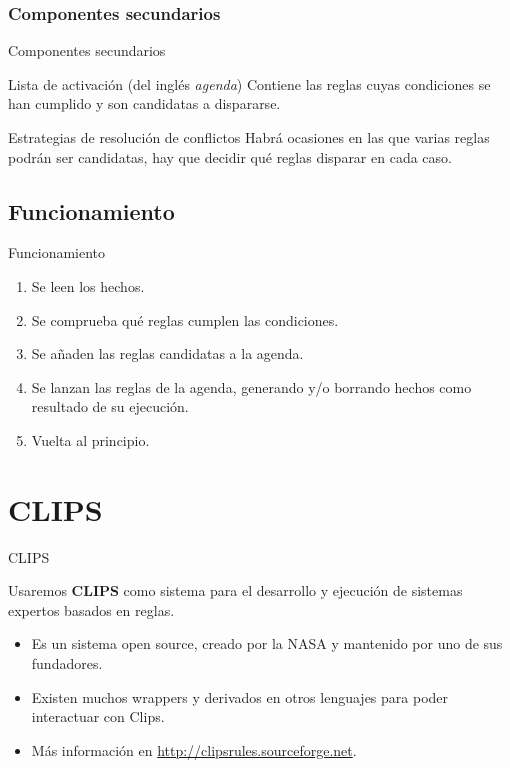 \documentclass[smaller,spanish,xcolor=svgnames]{beamer}
\begin{document}
\subsubsection{Componentes secundarios}

\begin{frame}{Componentes secundarios}
    \begin{block}{Lista de activación (del inglés \textit{agenda})}
      Contiene las reglas cuyas condiciones se han cumplido y son candidatas a
      dispararse.
    \end{block}

    \begin{block}{Estrategias de resolución de conflictos}
      Habrá ocasiones en las que varias reglas podrán ser candidatas, hay que
      decidir qué reglas disparar en cada caso.
    \end{block}  
\end{frame}

\subsection{Funcionamiento}
\begin{frame}{Funcionamiento}
  \begin{enumerate}
  \item Se leen los hechos.
  \item Se comprueba qué reglas cumplen las condiciones.
  \item Se añaden las reglas candidatas a la agenda.
  \item Se lanzan las reglas de la agenda, generando y/o borrando hechos como resultado de su ejecución.
  \item Vuelta al principio.
  \end{enumerate}

\end{frame}

\section{CLIPS}
\begin{frame}{CLIPS}
  \begin{block}{}
    Usaremos \textbf{CLIPS} como sistema para el desarrollo y ejecución de
    sistemas expertos basados en reglas.
  \end{block}

  \begin{itemize}
  \item Es un sistema open source, creado por la NASA y mantenido por uno de sus
    fundadores.
  \item Existen muchos wrappers y derivados en otros lenguajes para poder
    interactuar con Clips.
  \item Más información en \url{http://clipsrules.sourceforge.net}.
  \end{itemize}
\end{frame}
\end{document}
